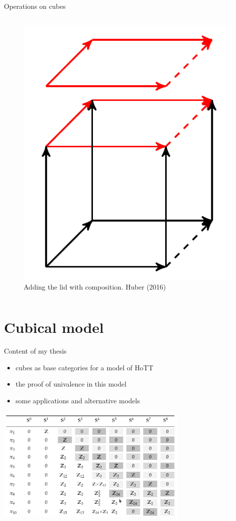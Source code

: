 \documentclass[english,draft]{beamer}
\begin{document}
\begin{frame}{Operations on cubes}
\begin{columns}[c]
        \begin{figure}[h!]
                \includegraphics[height=.4\textheight]{figures/extension.png}
                \caption{Adding the lid with composition. Huber (2016)}
        \end{figure} 

        
\end{columns}
\end{frame}



\section{Cubical model}


\begin{frame}{Content of my thesis}

\begin{itemize}
\item cubes as base categories for a model of HoTT
\item the proof of univalence in this model
\item some applications and alternative models
\end{itemize}

\centering
\includegraphics[width=0.7\textwidth]{figures/groups}


\end{frame}
\end{document}
